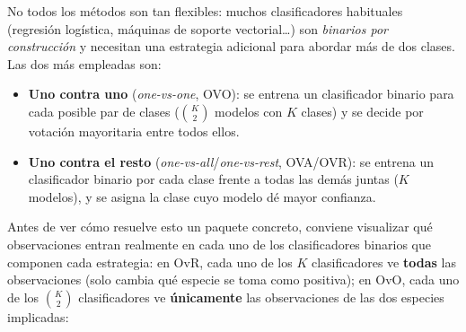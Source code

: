 \documentclass[
]{book}
\providecommand{\tightlist}{%
  \setlength{\itemsep}{0pt}\setlength{\parskip}{0pt}}
\theoremstyle{break}
\theoremstyle{nonumberplain}
\begin{document}
No todos los métodos son tan flexibles: muchos clasificadores habituales (regresión logística, máquinas de soporte vectorial\ldots) son \emph{binarios por construcción} y necesitan una estrategia adicional para abordar más de dos clases. Las dos más empleadas son:

\begin{itemize}
\tightlist
\item
  \textbf{Uno contra uno} (\emph{one-vs-one}, OVO): se entrena un clasificador binario para cada posible par de clases (\(\binom{K}{2}\) modelos con \(K\) clases) y se decide por votación mayoritaria entre todos ellos.
\item
  \textbf{Uno contra el resto} (\emph{one-vs-all}/\emph{one-vs-rest}, OVA/OVR): se entrena un clasificador binario por cada clase frente a todas las demás juntas (\(K\) modelos), y se asigna la clase cuyo modelo dé mayor confianza.
\end{itemize}

Antes de ver cómo resuelve esto un paquete concreto, conviene visualizar qué observaciones entran realmente en cada uno de los clasificadores binarios que componen cada estrategia: en OvR, cada uno de los \(K\) clasificadores ve \textbf{todas} las observaciones (solo cambia qué especie se toma como positiva); en OvO, cada uno de los \(\binom{K}{2}\) clasificadores ve \textbf{únicamente} las observaciones de las dos especies implicadas:
\end{document}
